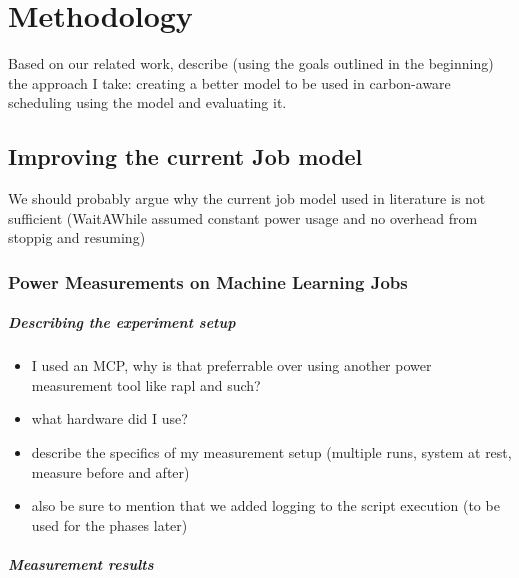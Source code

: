 \chapter{Methodology}

Based on our related work, describe (using the goals outlined in the beginning) the approach I take:
creating a better model to be used in carbon-aware scheduling 
using the model and evaluating it.
\section{Improving the current Job model}

We should probably argue why the current job model used in literature is not sufficient (WaitAWhile assumed constant power usage and no overhead from stoppig and resuming)

\subsection{Power Measurements on Machine Learning Jobs}


\paragraph{Describing the experiment setup}

\begin{itemize}
    \item I used an MCP, why is that preferrable over using another power measurement tool like rapl and such?
    \item what hardware did I use?
    \item describe the specifics of my measurement setup (multiple runs, system at rest, measure before and after)
    \item also be sure to mention that we added logging to the script execution (to be used for the phases later)
\end{itemize}

\paragraph{Measurement results}


